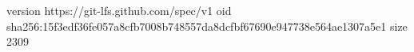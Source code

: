 version https://git-lfs.github.com/spec/v1
oid sha256:15f3edf36fe057a8cfb7008b748557da8dcfbf67690e947738e564ae1307a5e1
size 2309
